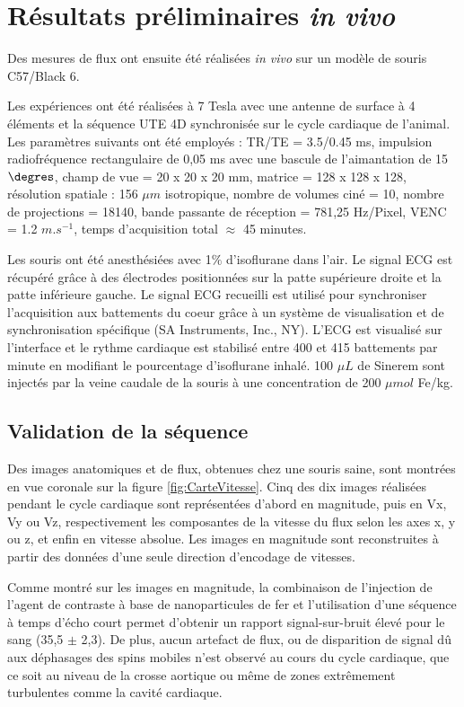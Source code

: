\section{Résultats préliminaires \textit{in vivo}}

Des mesures de flux ont ensuite été réalisées \textit{in vivo} sur un modèle de souris C57/Black 6.

Les expériences ont été réalisées à 7 Tesla avec une antenne de surface à 4 éléments et la séquence UTE 4D synchronisée sur le cycle cardiaque de l’animal. Les  paramètres suivants ont été employés :
TR/TE = 3.5/0.45 ms, impulsion radiofréquence rectangulaire de 0,05 ms avec une bascule de l'aimantation de 15$\degres$, champ de vue = 20 x 20 x 20 mm, matrice = 128 x 128 x 128, résolution spatiale : 156 $\mu m$ isotropique, nombre de volumes ciné = 10, nombre de projections  = 18140, bande passante de réception = 781,25 Hz/Pixel, VENC = 1.2 $m.s^{-1}$, temps d'acquisition total $\approx$ 45 minutes.

Les souris ont été anesthésiées avec 1$\%$ d'isoflurane dans l'air. Le signal ECG est récupéré grâce à des électrodes positionnées sur la patte supérieure droite et la patte inférieure gauche. Le signal ECG recueilli est utilisé pour synchroniser l'acquisition aux battements du coeur grâce à un système de visualisation et de synchronisation spécifique (SA Instruments, Inc., NY). L'ECG est visualisé sur l'interface et le rythme cardiaque est stabilisé entre 400 et 415 battements par minute en modifiant le pourcentage d'isoflurane inhalé. 100 $\mu L$ de Sinerem sont injectés par la veine caudale de la souris à une concentration de 200 $\mu mol$ Fe/kg.

\subsection{Validation de la séquence}

Des images anatomiques et de flux, obtenues chez une souris saine, sont montrées en vue coronale sur la figure \ref{fig:CarteVitesse}. Cinq des dix images réalisées pendant le cycle cardiaque sont représentées d'abord en magnitude, puis en Vx, Vy ou Vz, respectivement les composantes de la vitesse du flux selon les axes x, y ou z, et enfin en vitesse absolue. Les images en magnitude sont reconstruites à partir des données d'une seule direction d'encodage de vitesses.

Comme montré sur les images en magnitude, la combinaison de l’injection de l’agent de contraste à base de nanoparticules de fer et l’utilisation d’une séquence à temps d’écho court permet d’obtenir un rapport signal-sur-bruit élevé pour le sang (35,5 $\pm$ 2,3). De plus, aucun artefact de flux, ou de disparition de signal dû aux déphasages des spins mobiles n’est observé au cours du cycle cardiaque, que ce soit au niveau de la crosse aortique ou même de zones extrêmement turbulentes comme la cavité cardiaque.

